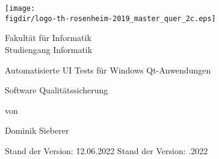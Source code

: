 \begin{titlepage}

\sffamily

\raggedleft

\vspace*{-2cm}

\texttt{[image: \\figdir/logo-th-rosenheim-2019\_master\_quer\_2c.eps]}

\vfill

\centering
\LARGE
Fakultät für Informatik  \vspace{0.5cm}\\
\Large
Studiengang Informatik

\vspace{2cm}

\LARGE

\centerline{Automatisierte UI Tests für Windows Qt-Anwendungen}	 


\vspace{2cm}

\Large
Software Qualitätssicherung

\vspace{1.5cm}


\Large
von

\vspace{0.5cm}


\LARGE
Dominik Sieberer \vspace{1cm}

\vspace{1cm}

\flushleft
 \Large
\vspace*{\fill}

\begin{tabbing}
Stand der Version: \= 12.06.2022 \kill
Stand der Version: .2022 \\
\end{tabbing}

\end{titlepage}

\cleardoubleemptypage









